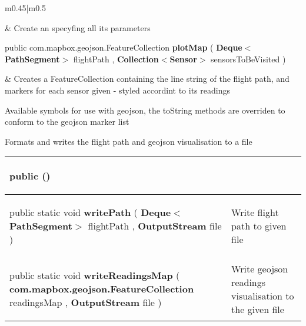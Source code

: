 {\begin{tabularx}{\linewidth}{m{0.45\textwidth}|m{0.5\textwidth}}
\begin{raggedleft}
\end{raggedleft} &
 Create an \hyperref[tab:AQMapGenerator]{\color{blue}{AQMapGenerator}} specyfing all its parameters\\ \hline 
\begin{raggedleft}public com.mapbox.geojson.FeatureCollection \textbf{plotMap }(\newline \hfill 
\hspace*{ 5pt} \textbf{Deque$<$PathSegment$>$} flightPath , \newline
 \hspace*{ 5pt} \textbf{Collection$<$Sensor$>$} sensorsToBeVisited  )
\end{raggedleft} &
 Creates a FeatureCollection containing the line string of the flight path, and markers for each sensor given {-} styled accordint to its readings\\\end{tabularx}
}
 {\scriptsize Available symbols for use with geojson, the toString methods are overriden to conform to the geojson marker list
 
\label{tab:MarkerSymbol}
}
 {\scriptsize Formats and writes the flight path and geojson visualisation to a file
 
\vspace*{-5pt} 
\begin{tabularx}{\linewidth}{m{}|m{}}
\label{tab:OutputFormatter}
\begin{raggedleft}public  \textbf{\hyperref[tab:OutputFormatter]{\color{blue}{OutputFormatter}}}()
\end{raggedleft} &
 \\ \hline 
\begin{raggedleft}public static void \textbf{writePath }(\newline \hfill 
\hspace*{ 5pt} \textbf{Deque$<$PathSegment$>$} flightPath , \newline
 \hspace*{ 5pt} \textbf{OutputStream} file  )
\end{raggedleft} &
 Write flight path to given file\\ \hline 
\begin{raggedleft}public static void \textbf{writeReadingsMap }(\newline \hfill 
\hspace*{ 5pt} \textbf{com.mapbox.geojson.FeatureCollection} readingsMap , \newline
 \hspace*{ 5pt} \textbf{OutputStream} file  )
\end{raggedleft} &
 Write geojson readings visualisation to the given file\\\end{tabularx}
}
